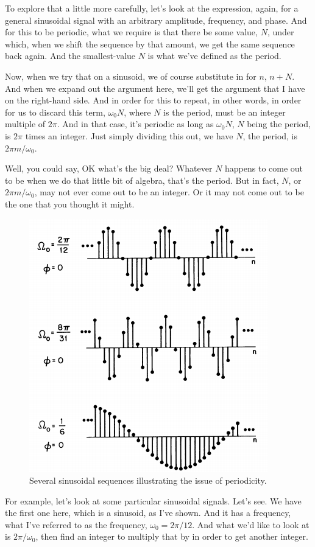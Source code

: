 \documentclass[fleqn,10pt]{olplainarticle}
\theoremstyle{definition}
\theoremstyle{remark}
\begin{document}
To explore that a little more carefully, let's look at the expression, again, for a general sinusoidal signal with an arbitrary amplitude, frequency, and phase. And for this to be periodic, what we require is that there be some value, $N$, under which, when we shift the sequence by that amount, we get the same sequence back again. And the smallest-value $N$ is what we've defined as the period.

Now, when we try that on a sinusoid, we of course substitute in for $n$, $n + N$. And when we expand out the argument here, we'll get the argument that I have on the right-hand side. And in order for this to repeat, in other words, in order for us to discard this term, $\omega_0 N$, where $N$ is the period, must be an integer multiple of $2 \pi$. And in that case, it's periodic as long as $\omega_0 N$, $N$ being the period, is $2 \pi$ times an integer. Just simply dividing this out, we have $N$, the period, is $2 \pi m / \omega_0$.

Well, you could say, OK what's the big deal? Whatever $N$ happens to come out to be when we do that little bit of algebra, that's the period. But in fact, $N$, or $2 \pi m / \omega_0$, may not ever come out to be an integer. Or it may not come out to be the one that you thought it might.

\begin{figure}[ht]
	\centering
	\includegraphics[width=0.5\linewidth]{images/signals_11.png}
	\caption{Several sinusoidal sequences illustrating the issue of periodicity.}
	\label{fig:signals_11}
\end{figure}

For example, let's look at some particular sinusoidal signals. Let's see. We have the first one here, which is a sinusoid, as I've shown. And it has a frequency, what I've referred to as the frequency, $\omega_0 = 2 \pi / 12$. And what we'd like to look at is $2 \pi / \omega_0$, then find an integer to multiply that by in order to get another integer.
\end{document}
